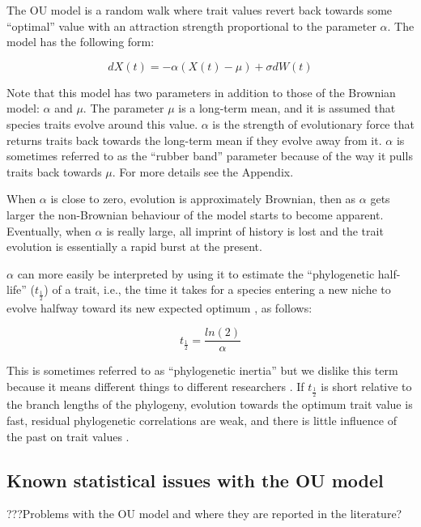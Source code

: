 \documentclass[a4paper,12pt]{article}
\begin{document}
    The OU model \citep{hansen1997stabilizing,Butler:2004aa} is a random walk where trait values revert back towards some ``optimal'' value with an attraction strength proportional to the parameter $\alpha$. 
    The model has the following form:
  
      \begin{equation}
        dX(t) = - \alpha (X(t) - \mu) + \sigma dW(t)
      \end{equation}
    
    \noindent
    Note that this model has two parameters in addition to those of the Brownian model: $\alpha$ and $\mu$. 
    The parameter $\mu$ is a long-term mean, and it is assumed that species traits evolve around this value. 
    $\alpha$ is the strength of evolutionary force that returns traits back towards the long-term mean if they evolve away from it. 
    $\alpha$ is sometimes referred to as the ``rubber band'' parameter because of the way it pulls traits back towards $\mu$. For more details see the Appendix.
    
    When $\alpha$ is close to zero, evolution is approximately Brownian, then as $\alpha$ gets larger the non-Brownian behaviour of the model starts to become apparent. 
    Eventually, when $\alpha$ is really large, all imprint of history is lost and the trait evolution is essentially a rapid burst at the present.

    $\alpha$ can more easily be interpreted by using it to estimate the ``phylogenetic half-life'' ($t_\frac{1}{2}$) of a trait, i.e., the time it takes for a species entering a new niche to evolve halfway toward its new expected optimum \citep{hansen1997stabilizing}, as follows:

      \begin{equation}
        t_\frac{1}{2} = \frac{ln(2)}{\alpha}
        \label{equation:halflife}
      \end{equation}
    
    \noindent
    This is sometimes referred to as ``phylogenetic inertia'' but we dislike this term because it means different things to different researchers \citep{Losos:2008aa}.
    If $t_\frac{1}{2}$ is short relative to the branch lengths of the phylogeny, evolution towards the optimum trait value is fast, residual phylogenetic correlations are weak, and there is little influence of the past on trait values \citep{hansen1997stabilizing}. 
  
  \subsection{Known statistical issues with the OU model}
  ???Problems with the OU model and where they are reported in the literature?
\end{document}
